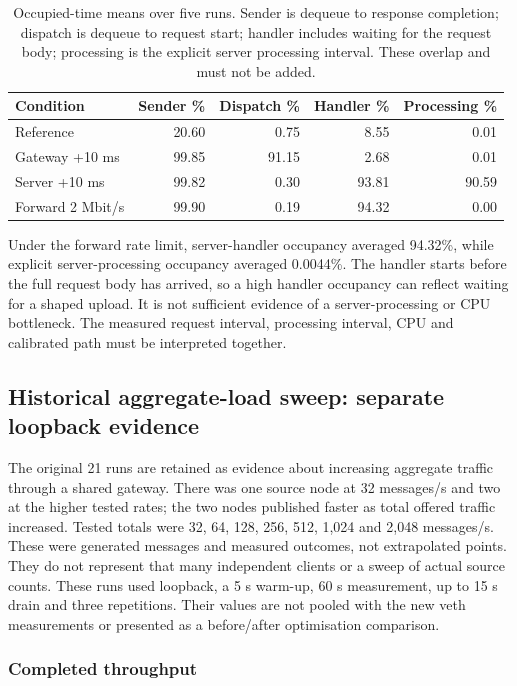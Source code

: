 \begin{table}[H]
\centering\small
\setlength{\tabcolsep}{4pt}
\begin{tabular}{lrrrr}
\hline
Condition & Sender \% & Dispatch \% & Handler \% & Processing \% \\
\hline
Reference & 20.60 & 0.75 & 8.55 & 0.01 \\
Gateway +10 ms & 99.85 & 91.15 & 2.68 & 0.01 \\
Server +10 ms & 99.82 & 0.30 & 93.81 & 90.59 \\
Forward 2 Mbit/s & 99.90 & 0.19 & 94.32 & 0.00 \\
\hline
\end{tabular}
\caption{Occupied-time means over five runs. Sender is dequeue to response completion; dispatch is dequeue to request start; handler includes waiting for the request body; processing is the explicit server processing interval. These overlap and must not be added.}
\label{tab:e1r-activity}
\end{table}


Under the forward rate limit, server-handler occupancy averaged 94.32\%, while explicit server-processing occupancy averaged 0.0044\%. The handler starts before the full request body has arrived, so a high handler occupancy can reflect waiting for a shaped upload. It is not sufficient evidence of a server-processing or CPU bottleneck. The measured request interval, processing interval, CPU and calibrated path must be interpreted together.

\clearpage\subsection{Historical aggregate-load sweep: separate loopback evidence}

The original 21 runs are retained as evidence about increasing aggregate traffic through a shared gateway. There was one source node at 32 messages/s and two at the higher tested rates; the two nodes published faster as total offered traffic increased. Tested totals were 32, 64, 128, 256, 512, 1,024 and 2,048 messages/s. These were generated messages and measured outcomes, not extrapolated points. They do not represent that many independent clients or a sweep of actual source counts. These runs used loopback, a 5 s warm-up, 60 s measurement, up to 15 s drain and three repetitions. Their values are not pooled with the new veth measurements or presented as a before/after optimisation comparison.

\subsubsection{Completed throughput}

